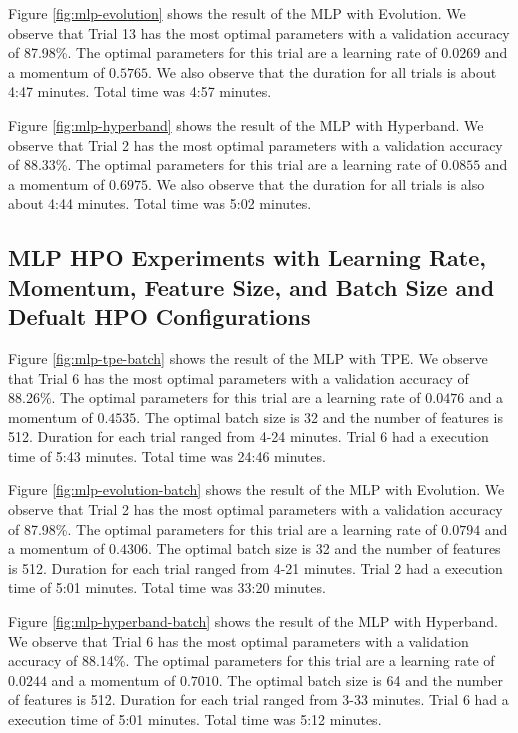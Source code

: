 \documentclass{article}
\begin{document}
Figure \ref{fig:mlp-evolution} shows the result of the MLP with Evolution. We observe that Trial 13 has the most optimal parameters with a validation accuracy of 87.98\%. The optimal parameters for this trial are a learning rate of $0.0269$ and a momentum of $0.5765$. We also observe that the duration for all trials is about 4:47 minutes. Total time was 4:57 minutes.

Figure \ref{fig:mlp-hyperband} shows the result of the MLP with Hyperband. We observe that Trial 2 has the most optimal parameters with a validation accuracy of 88.33\%. The optimal parameters for this trial are a learning rate of $0.0855$ and a momentum of $0.6975$. We also observe that the duration for all trials is also about 4:44 minutes. Total time was 5:02 minutes.

\subsection{MLP HPO Experiments with Learning Rate, Momentum, Feature Size, and Batch Size and Defualt HPO Configurations}
Figure \ref{fig:mlp-tpe-batch} shows the result of the MLP with TPE. We observe that Trial 6 has the most optimal parameters with a validation accuracy of 88.26\%. The optimal parameters for this trial are a learning rate of $0.0476$ and a momentum of $0.4535$. The optimal batch size is 32 and the number of features is 512. Duration for each trial ranged from 4-24 minutes. Trial 6 had a execution time of 5:43 minutes. Total time was 24:46 minutes.

Figure \ref{fig:mlp-evolution-batch} shows the result of the MLP with Evolution. We observe that Trial 2 has the most optimal parameters with a validation accuracy of 87.98\%. The optimal parameters for this trial are a learning rate of $0.0794$ and a momentum of $0.4306$. The optimal batch size is 32 and the number of features is 512. Duration for each trial ranged from 4-21 minutes. Trial 2 had a execution time of 5:01 minutes. Total time was 33:20 minutes.

Figure \ref{fig:mlp-hyperband-batch} shows the result of the MLP with Hyperband. We observe that Trial 6 has the most optimal parameters with a validation accuracy of 88.14\%. The optimal parameters for this trial are a learning rate of $0.0244$ and a momentum of $0.7010$. The optimal batch size is 64 and the number of features is 512. Duration for each trial ranged from 3-33 minutes. Trial 6 had a execution time of 5:01 minutes. Total time was 5:12 minutes.
\end{document}
